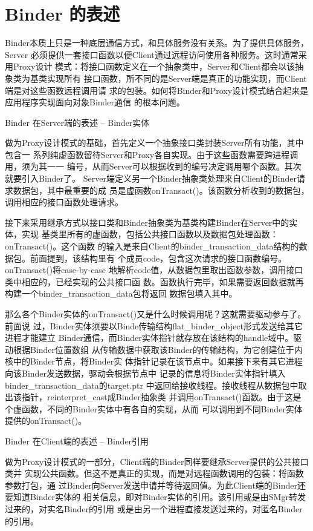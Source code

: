 \documentclass[a4paper,11pt]{article}
\begin{document}
\section{Binder 的表述}
Binder本质上只是一种底层通信方式，和具体服务没有关系。为了提供具体服务，Server
必须提供一套接口函数以便Client通过远程访问使用各种服务。这时通常采用Proxy设计
模式：将接口函数定义在一个抽象类中，Server和Client都会以该抽象类为基类实现所有
接口函数，所不同的是Server端是真正的功能实现，而Client端是对这些函数远程调用请
求的包装。如何将Binder和Proxy设计模式结合起来是应用程序实现面向对象Binder通信
的根本问题。

Binder 在Server端的表述 – Binder实体

做为Proxy设计模式的基础，首先定义一个抽象接口类封装Server所有功能，其中包含一
系列纯虚函数留待Server和Proxy各自实现。由于这些函数需要跨进程调用，须为其一一
编号，从而Server可以根据收到的编号决定调用哪个函数。其次就要引入Binder了。
Server端定义另一个Binder抽象类处理来自Client的Binder请求数据包，其中最重要的成
员是虚函数onTransact()。该函数分析收到的数据包，调用相应的接口函数处理请求。

接下来采用继承方式以接口类和Binder抽象类为基类构建Binder在Server中的实体，实现
基类里所有的虚函数，包括公共接口函数以及数据包处理函数：onTransact()。这个函数
的输入是来自Client的binder_transaction_data结构的数据包。前面提到，该结构里有
个成员code，包含这次请求的接口函数编号。onTransact()将case-by-case
地解析code值，从数据包里取出函数参数，调用接口类中相应的，已经实现的公共接口函
数。函数执行完毕，如果需要返回数据就再构建一个binder_transaction_data包将返回
数据包填入其中。

那么各个Binder实体的onTransact()又是什么时候调用呢？这就需要驱动参与了。前面说
过，Binder实体须要以Binde传输结构flat_binder_object形式发送给其它进程才能建立
Binder通信，而Binder实体指针就存放在该结构的handle域中。驱动根据Binder位置数组
从传输数据中获取该Binder的传输结构，为它创建位于内核中的Binder节点，将Binder实
体指针记录在该节点中。如果接下来有其它进程向该Binder发送数据，驱动会根据节点中
记录的信息将Binder实体指针填入binder_transaction_data的target.ptr
中返回给接收线程。接收线程从数据包中取出该指针，reinterpret_cast成Binder抽象类
并调用onTransact()函数。由于这是个虚函数，不同的Binder实体中有各自的实现，从而
可以调用到不同Binder实体提供的onTransact()。


 Binder 在Client端的表述 – Binder引用

做为Proxy设计模式的一部分，Client端的Binder同样要继承Server提供的公共接口类并
实现公共函数。但这不是真正的实现，而是对远程函数调用的包装：将函数参数打包，通
过Binder向Server发送申请并等待返回值。为此Client端的Binder还要知道Binder实体的
相关信息，即对Binder实体的引用。该引用或是由SMgr转发过来的，对实名Binder的引用
或是由另一个进程直接发送过来的，对匿名Binder的引用。
\end{document}
